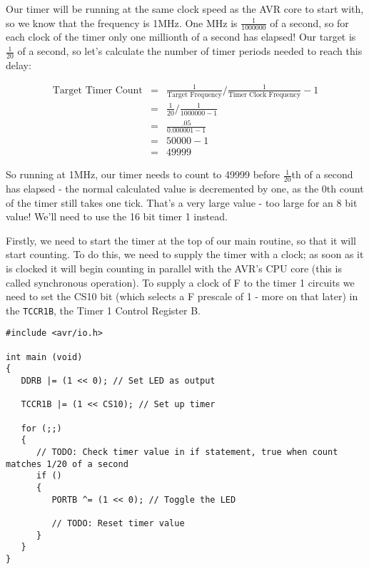 \documentclass[a4paper,oneside,notitlepage]{book}
\begin{document}
Our timer will be running at the same clock speed as the AVR core to start with, so we know that the frequency is 1MHz. One MHz is \(\frac{1}{1000000}\) of a second, so for each clock of the timer only one millionth of a second has elapsed! Our target is \(\frac{1}{20}\) of a second, so let's calculate the number of timer periods needed to reach this delay:

\begin{displaymath}
\begin{array}{rcl}
\text{Target Timer Count} & = & \frac{1}{\text{Target Frequency}} / \frac{1}{\text{Timer Clock Frequency}} - 1 \\
                          & = & \frac{1}{20} / \frac{1}{1000000 - 1} \\
                          & = & \frac{.05}{0.000001 - 1} \\
                          & = & 50000 - 1 \\
                          & = & 49999
\end{array}
\end{displaymath}

So running at 1MHz, our timer needs to count to 49999 before \(\frac{1}{20}\)th of a second has elapsed - the normal calculated value is decremented by one, as the 0th count of the timer still takes one tick. That's a very large value - too large for an 8 bit value! We'll need to use the 16 bit timer 1 instead.

Firstly, we need to start the timer at the top of our main routine, so that it will start counting. To do this, we need to supply the timer with a clock; as soon as it is clocked it will begin counting in parallel with the AVR's CPU core (this is called synchronous operation). To supply a clock of F to the timer 1 circuits we need to set the CS10 bit (which selects a F prescale of 1 - more on that later) in the \texttt{TCCR1B}, the Timer 1 Control Register B. 

\begin{center}
\begin{lstlisting}
#include <avr/io.h>

int main (void)
{
   DDRB |= (1 << 0); // Set LED as output

   TCCR1B |= (1 << CS10); // Set up timer

   for (;;)
   {
      // TODO: Check timer value in if statement, true when count matches 1/20 of a second
      if ()
      {
         PORTB ^= (1 << 0); // Toggle the LED

         // TODO: Reset timer value
      }
   }
} 
\end{lstlisting}
\end{center}
\end{document}
